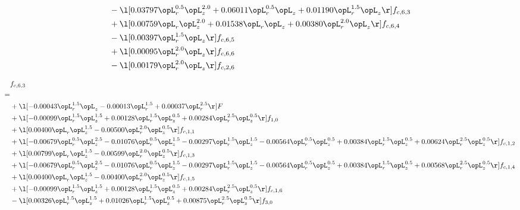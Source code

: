 \begin{alignat}{2}
& - \l[  0.03797 \opL_r^{0.5} \opL_z^{2.0} +  0.06011 \opL_r^{0.5} \opL_z +  0.01190 \opL_r^{1.5} \opL_z  \r] f_{c,6,3} \nonumber \\ 
& + \l[  0.00759 \opL_r \opL_z^{2.0} +  0.01538 \opL_r \opL_z +  0.00380 \opL_r^{2.0} \opL_z  \r] f_{c,6,4} \nonumber \\ 
& - \l[  0.00397 \opL_r^{1.5} \opL_z  \r] f_{c,6,5} \nonumber \\ 
& + \l[  0.00095 \opL_r^{2.0} \opL_z  \r] f_{c,6,6} \nonumber \\ 
& - \l[  0.00179 \opL_r^{2.0} \opL_z  \r] f_{c,2,6} \nonumber \\ 
\end{alignat} 


\begin{alignat}{2} 
\label{eq:f_63_1} 
& f_{c,6,3} \nonumber \\ 
 = \\ 
& + \l[  -0.00043 \opL_r^{1.5} \opL_z   -0.00013 \opL_r^{1.5} +  0.00037 \opL_r^{2.5}  \r] F \nonumber \\ 
& + \l[  -0.00099 \opL_r^{1.5} \opL_z^{1.5} +  0.00128 \opL_r^{1.5} \opL_z^{0.5} +  0.00284 \opL_r^{2.5} \opL_z^{0.5}  \r] f_{1,0} \nonumber \\ 
& + \l[  0.00400 \opL_r \opL_z^{1.5}   -0.00500 \opL_r^{2.0} \opL_z^{0.5}  \r] f_{c,1,1} \nonumber \\ 
& + \l[  -0.00679 \opL_r^{0.5} \opL_z^{2.5}   -0.01076 \opL_r^{0.5} \opL_z^{1.5}   -0.00297 \opL_r^{1.5} \opL_z^{1.5}   -0.00564 \opL_r^{0.5} \opL_z^{0.5} +  0.00384 \opL_r^{1.5} \opL_z^{0.5} +  0.00624 \opL_r^{2.5} \opL_z^{0.5}  \r] f_{c,1,2} \nonumber \\ 
& + \l[  0.00799 \opL_r \opL_z^{1.5}   -0.00599 \opL_r^{2.0} \opL_z^{0.5}  \r] f_{c,1,3} \nonumber \\ 
& + \l[  -0.00679 \opL_r^{0.5} \opL_z^{2.5}   -0.01076 \opL_r^{0.5} \opL_z^{1.5}   -0.00297 \opL_r^{1.5} \opL_z^{1.5}   -0.00564 \opL_r^{0.5} \opL_z^{0.5} +  0.00384 \opL_r^{1.5} \opL_z^{0.5} +  0.00568 \opL_r^{2.5} \opL_z^{0.5}  \r] f_{c,1,4} \nonumber \\ 
& + \l[  0.00400 \opL_r \opL_z^{1.5}   -0.00400 \opL_r^{2.0} \opL_z^{0.5}  \r] f_{c,1,5} \nonumber \\ 
& + \l[  -0.00099 \opL_r^{1.5} \opL_z^{1.5} +  0.00128 \opL_r^{1.5} \opL_z^{0.5} +  0.00284 \opL_r^{2.5} \opL_z^{0.5}  \r] f_{c,1,6} \nonumber \\ 
& - \l[  0.00326 \opL_r^{1.5} \opL_z^{1.5} +  0.01026 \opL_r^{1.5} \opL_z^{0.5} +  0.00875 \opL_r^{2.5} \opL_z^{0.5}  \r] f_{3,0} \nonumber \\ 

\end{alignat}
